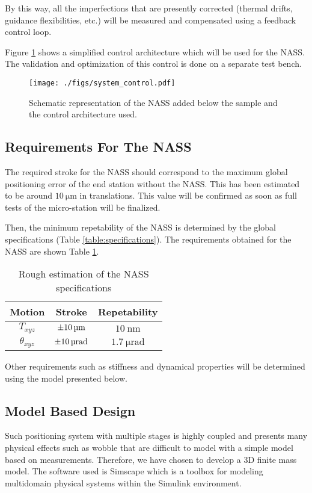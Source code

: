 \documentclass[a4paper, keeplastbox, biblatex]{jacow}
\begin{document}
By this way, all the imperfections that are presently corrected (thermal drifts, guidance flexibilities, etc.) will be measured and compensated using a feedback control loop.

Figure \ref{fig:system_control} shows a simplified control architecture which will be used for the NASS. The validation and optimization of this control is done on a separate test bench.

\begin{figure}[htbp]
\centering
\texttt{[image: ./figs/system\_control.pdf]}
\caption{\label{fig:system_control}
Schematic representation of the NASS added below the sample and the control architecture used.}
\end{figure}

\subsection{Requirements For The NASS}
\label{sec:org24c8374}
The required stroke for the NASS should correspond to the maximum global positioning error of the end station without the NASS.
This has been estimated to be around \(\SI{10}{\micro\metre}\) in translations. This value will be confirmed as soon as full tests of the micro-station will be finalized.

Then, the minimum repetability of the NASS is determined by the global specifications (Table \ref{table:specifications}).
The requirements obtained for the NASS are shown Table \ref{table:nass_specification}.

\begin{table}[!htpb]
\caption{\label{table:nass_specification}
Rough estimation of the NASS specifications}
\centering
\begin{tabular}{ccc}
\hline
Motion & Stroke & Repetability\\
\hline
\(T_{xyz}\) & \(\SI{\pm 10}{\micro\metre}\) & \(\SI{10}{\nano\metre}\)\\
\(\theta_{xyz}\) & \(\SI{\pm 10}{\micro\radian}\) & \(\SI{1.7}{\micro\radian}\)\\
\hline
\end{tabular}
\end{table}

Other requirements such as stiffness and dynamical properties will be determined using the model presented below.

\subsection{Model Based Design}
\label{sec:orgd64fc40}
Such positioning system with multiple stages is highly coupled and presents many physical effects such as wobble that are difficult to model with a simple model based on measurements.
Therefore, we have chosen to develop a 3D finite mass model. The software used is Simscape which is a toolbox for modeling multidomain physical systems within the Simulink environment.
\end{document}
